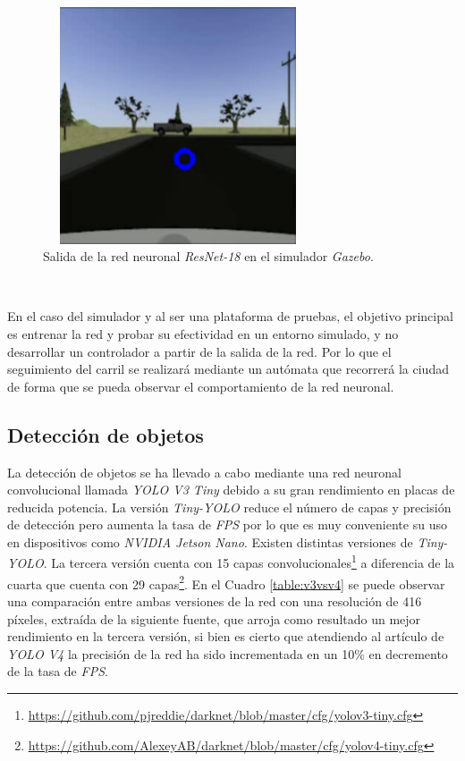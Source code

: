 \begin{figure} [h!]
	\begin{center}
		\includegraphics[width=8cm, height=7cm]{figs/outputNNsim}
	\end{center}
	\caption{Salida de la red neuronal \textit{ResNet-18} en el simulador \textit{Gazebo}.}
	\label{fig:outputnnsim}
\end{figure}\

En el caso del simulador y al ser una plataforma de pruebas, el objetivo principal es entrenar la red y probar su efectividad en un entorno simulado, y no desarrollar un
controlador a partir de la salida de la red. Por lo que el seguimiento del carril se realizará mediante un autómata que recorrerá la ciudad de forma que se pueda observar el
comportamiento de la red neuronal.\\

\subsection{Detección de objetos}
\label{subsection:objectdetector}
La detección de objetos se ha llevado a cabo mediante una red neuronal convolucional llamada \textit{YOLO V3 Tiny} debido a su gran rendimiento en placas de reducida potencia. La
versión \textit{Tiny-YOLO} reduce el número de capas y precisión de detección pero aumenta la tasa de \textit{FPS} por lo que es muy conveniente su uso en dispositivos como
\textit{NVIDIA Jetson Nano}. Existen distintas versiones de \textit{Tiny-YOLO}. La tercera versión cuenta con 15 capas
convolucionales\footnote{\url{https://github.com/pjreddie/darknet/blob/master/cfg/yolov3-tiny.cfg}} a diferencia de la cuarta que cuenta con 29
capas\footnote{\url{https://github.com/AlexeyAB/darknet/blob/master/cfg/yolov4-tiny.cfg}}. En el Cuadro \ref{table:v3vsv4} se puede observar una comparación entre ambas versiones
de la red con una resolución de 416 píxeles, extraída de la siguiente fuente\cite{versus}, que arroja como resultado un mejor rendimiento en la tercera versión, si bien es cierto
que atendiendo al artículo de \textit{YOLO V4} \cite{yolov4} la precisión de la red ha sido incrementada en un 10\% en decremento de la tasa de \textit{FPS}.\\

